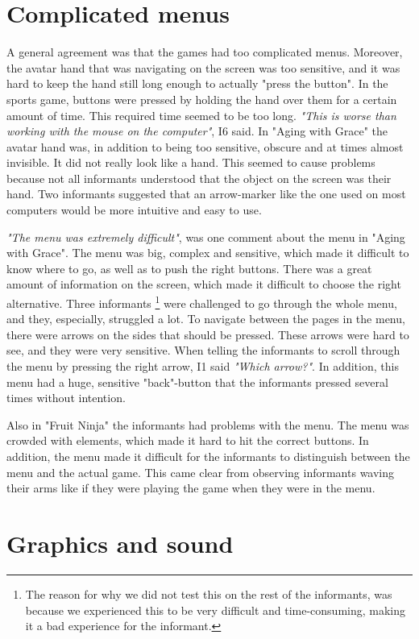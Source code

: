 \section{Complicated menus}
A general agreement was that the games had too complicated menus. Moreover, the avatar hand that was navigating on the screen was too sensitive, and it was hard to keep the hand still long enough to actually "press the button". In the sports game, buttons were pressed by holding the hand over them for a certain amount of time. This required time seemed to be too long. \emph{"This is worse than working with the mouse on the computer"}, I6 said. In "Aging with Grace" the avatar hand was, in addition to being too sensitive, obscure and at times almost invisible. It did not really look like a hand. This seemed to cause problems because not all informants understood that the object on the screen was their hand. Two informants suggested that an arrow-marker like the one used on most computers would be more intuitive and easy to use. 

\emph{"The menu was extremely difficult"}, was one comment about the menu in "Aging with Grace". The menu was big, complex and sensitive, which made it difficult to know where to go, as well as to push the right buttons. There was a great amount of information on the screen, which made it difficult to choose the right alternative. Three informants \footnote{The reason for why we did not test this on the rest of the informants, was because we experienced this to be very difficult and time-consuming, making it a bad experience for the informant.} were challenged to go through the whole menu, and they, especially, struggled a lot. To navigate between the pages in the menu, there were arrows on the sides that should be pressed. These arrows were hard to see, and they were very sensitive. When telling the informants to scroll through the menu by pressing the right arrow, I1 said \emph{"Which arrow?"}. In addition, this menu had a huge, sensitive "back"-button that the informants pressed several times without intention. 

Also in "Fruit Ninja" the informants had problems with the menu. The menu was crowded with elements, which made it hard to hit the correct buttons. In addition, the menu made it difficult for the informants to distinguish between the menu and the actual game. This came clear from observing informants waving their arms like if they were playing the game when they were in the menu. 

\section{Graphics and sound}


